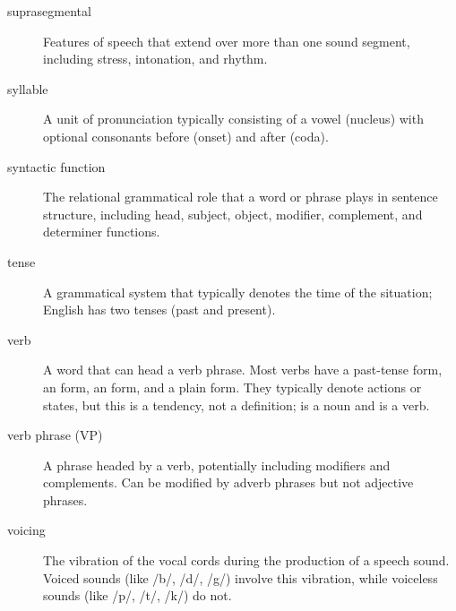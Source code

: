 \begin{description}
\item[suprasegmental] Features of speech that extend over more than one sound segment, including stress, intonation, and rhythm.

\item[syllable] A unit of pronunciation typically consisting of a vowel (nucleus) with optional consonants before (onset) and after (coda).

\item[syntactic function] The relational grammatical role that a word or phrase plays in sentence structure, including head, subject, object, modifier, complement, and determiner functions.

\item[tense] A grammatical system that typically denotes the time of the situation; English has two tenses (past and present).

\item[verb] A word that can head a verb phrase. Most verbs have a past-tense form, an  form, an  form, and a plain form. They typically denote actions or states, but this is a tendency, not a definition;  is a noun and  is a verb.

\item[verb phrase (VP)] A phrase headed by a verb, potentially including modifiers and complements. Can be modified by adverb phrases but not adjective phrases.

\item[voicing] The vibration of the vocal cords during the production of a speech sound. Voiced sounds (like /b/, /d/, /g/) involve this vibration, while voiceless sounds (like /p/, /t/, /k/) do not.

\end{description}

